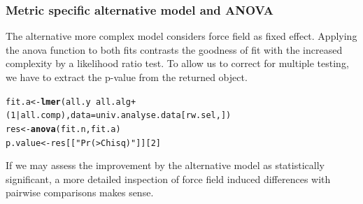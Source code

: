 \documentclass{article}\usepackage[table]{xcolor}
\makeatletter
\newcommand{\hlnum}[1]{\textcolor[rgb]{0.686,0.059,0.569}{#1}}%
\newcommand{\hlstr}[1]{\textcolor[rgb]{0.192,0.494,0.8}{#1}}%
\newcommand{\hlopt}[1]{\textcolor[rgb]{0,0,0}{#1}}%
\newcommand{\hlstd}[1]{\textcolor[rgb]{0.345,0.345,0.345}{#1}}%
\newcommand{\hlkwb}[1]{\textcolor[rgb]{0.69,0.353,0.396}{#1}}%
\newcommand{\hlkwc}[1]{\textcolor[rgb]{0.333,0.667,0.333}{#1}}%
\newcommand{\hlkwd}[1]{\textcolor[rgb]{0.737,0.353,0.396}{\textbf{#1}}}%
\newenvironment{kframe}{%
 \def\at@end@of@kframe{}%
 \ifinner\ifhmode%
  \def\at@end@of@kframe{\end{minipage}}%
  \begin{minipage}{\columnwidth}%
 \fi\fi%
 \def\FrameCommand##1{\hskip\@totalleftmargin \hskip-\fboxsep
 \colorbox{shadecolor}{##1}\hskip-\fboxsep
     \hskip-\linewidth \hskip-\@totalleftmargin \hskip\columnwidth}%
 \MakeFramed {\advance\hsize-\width
   \@totalleftmargin\z@ \linewidth\hsize
   \@setminipage}}%
 {\par\unskip\endMakeFramed%
 \at@end@of@kframe}
\newenvironment{knitrout}{}{} %
\renewcommand{\$}{$} %
\makeatother
\begin{document}
\subsubsection{Metric specific alternative model and ANOVA}
The alternative more complex model considers force field as fixed
effect. Applying the anova function to both fits contrasts the
goodness of fit with the increased complexity by a likelihood ratio
test. To allow us to correct for multiple testing, we have to extract
the p-value from the returned object.
\begin{knitrout}
\color{fgcolor}\begin{kframe}
\begin{alltt}
\hlstd{fit.a} \hlkwb{<-} \hlkwd{lmer}\hlstd{(all.y}\hlopt{~}\hlstd{all.alg}\hlopt{+}\hlstd{(}\hlnum{1}\hlopt{|}\hlstd{all.comp),} \hlkwc{data}\hlstd{= univ.analyse.data[rw.sel,])}
\hlstd{res} \hlkwb{<-} \hlkwd{anova}\hlstd{(fit.n, fit.a)}
\hlstd{p.value} \hlkwb{<-}  \hlstd{res[[}\hlstr{"Pr(>Chisq)"}\hlstd{]][}\hlnum{2}\hlstd{]}
\end{alltt}
\end{kframe}
\end{knitrout}

If we may assess the improvement by the alternative model as
statistically significant, a more detailed inspection of force field
induced differences with pairwise comparisons makes sense.
\end{document}
